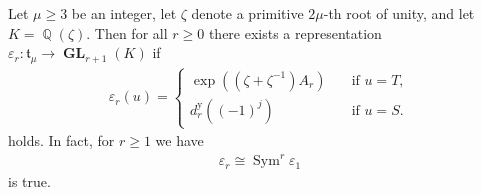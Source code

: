 \documentclass[10pt,a4paper]{amsart}
\DeclareMathOperator{\GL}{\mathbf{GL}}
\DeclareMathOperator{\QQ}{\mathbb{Q}}
\DeclareMathOperator{\Sym}{Sym}
\begin{document}
\begin{thm}
    Let $ \mu \geq 3 $ be an integer, let $\zeta$ denote a primitive $2\mu$-th root of unity, and let $ K =\QQ(\zeta)$. Then for all $r\geq 0$ there exists a representation $\varepsilon_r \colon \mathfrak{t}_\mu \to \GL_{r+1}(K) $    
    if
        \begin{eqnarray*}
            \varepsilon_r(u) = 
            \begin{cases}
                \exp((\zeta+\zeta^{-1})A_r) \quad & \text{if } u = T, \\
                d_r^{\text{y}}((-1)^j) & \text{if }u = S.
            \end{cases}
        \end{eqnarray*}
    holds. In fact, for $ r\geq 1 $ we have
        \begin{eqnarray*}
            \varepsilon_r \cong \Sym^{r}\varepsilon_1
        \end{eqnarray*}
    is true. 
\end{thm}
\end{document}
